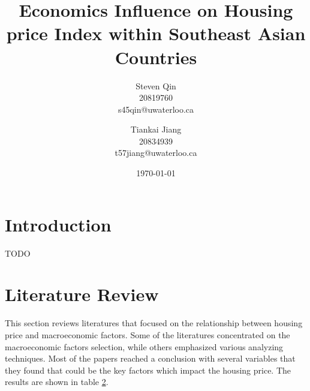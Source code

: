 \documentclass[11pt]{article}
\title{Economics Influence on Housing price Index within Southeast Asian Countries}
\author{Steven Qin\\20819760\\s45qin@uwaterloo.ca \and Tiankai Jiang\\20834939\\t57jiang@uwaterloo.ca}
\date{\today}
\begin{document}
\maketitle

\section{Introduction}\label{introduction}
TODO

\section{Literature Review}\label{literature_review}
This section reviews literatures that focused on the relationship between housing price and macroeconomic factors. Some of the literatures concentrated on the macroeconomic factors selection, while others emphasized various analyzing techniques. Most of the papers reached a conclusion with several variables that they found that could be the key factors which impact the housing price. The results are shown in table \ref{literature_review}.
\end{document}
